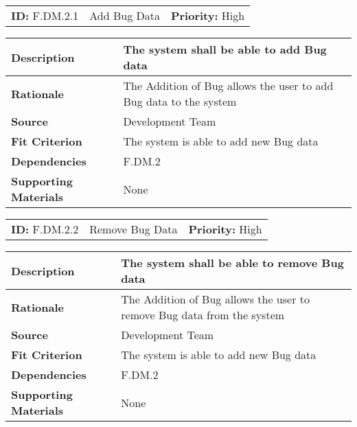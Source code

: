 \begin{table}[H]
    \begin{tabularx}{\textwidth}{| l | X | l |}
        \hline
        \textbf{ID:} F.DM.2.1 & Add Bug Data & \textbf{Priority:} High \\
    \end{tabularx}
    \begin{tabularx}{\textwidth}{| l | X |}
        \hline
        \textbf{Description} & The system shall be able to add Bug data \\ \hline
        \textbf{Rationale} & The Addition of Bug allows the user to add Bug data to the system\\ \hline
        \textbf{Source} & Development Team\\ \hline
        \textbf{Fit Criterion} & The system is able to add new Bug data\\ \hline
        \textbf{Dependencies} & F.DM.2 \\ \hline
        \textbf{Supporting Materials} & None \\ \hline
    \end{tabularx}
\end{table}

\begin{table}[H]
    \begin{tabularx}{\textwidth}{| l | X | l |}
        \hline
        \textbf{ID:} F.DM.2.2 & Remove Bug Data & \textbf{Priority:} High \\
    \end{tabularx}
    \begin{tabularx}{\textwidth}{| l | X |}
        \hline
        \textbf{Description} & The system shall be able to remove Bug data \\ \hline
        \textbf{Rationale} & The Addition of Bug allows the user to remove Bug data from the system\\ \hline
        \textbf{Source} & Development Team\\ \hline
        \textbf{Fit Criterion} & The system is able to add new Bug data\\ \hline
        \textbf{Dependencies} & F.DM.2 \\ \hline
        \textbf{Supporting Materials} & None \\ \hline
    \end{tabularx}
\end{table}

